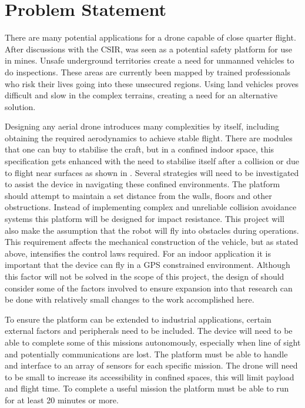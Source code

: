 	\section{Problem Statement}
	There are many potential applications for a drone capable of close quarter flight. After discussions with the CSIR, \projectName was seen as a potential safety platform for use in mines. Unsafe underground territories create a need for unmanned vehicles to do inspections. These areas are currently been mapped by trained professionals who risk their lives going into these unsecured regions. Using land vehicles proves difficult and slow in the complex terrains, creating a need for an alternative solution.
	
	Designing any aerial drone introduces many complexities by itself, including obtaining the required aerodynamics to achieve stable flight. There are modules that one can buy to stabilise the craft, but in a confined indoor space, this specification gets enhanced with the need to stabilise itself after a collision or due to flight near surfaces as shown in \cite{}. 
	Several strategies will need to be investigated to assist the device in navigating these confined environments. The platform should attempt to maintain a set distance from the walls, floors and other obstructions.
	Instead of implementing complex and unreliable collision avoidance systems this platform will be designed for impact resistance. This project will also make the assumption that the robot will fly into obstacles during operations. This requirement affects the mechanical construction of the vehicle, but as stated above, intensifies the control laws required.
	For an indoor application it is important that the device can fly in a GPS constrained environment. Although this factor will not be solved in the scope of this project, the design of \projectName should consider some of the factors involved to ensure expansion into that research can be done with relatively small changes to the work accomplished here.
	
	To ensure the platform can be extended to industrial applications, certain external factors and peripherals need to be included. The device will need to be able to complete some of this missions autonomously, especially when line of sight and potentially communications are lost.
	The platform must be able to handle and interface to an array of sensors for each specific mission. The drone will need to be small to increase its accessibility in confined spaces, this will limit payload and flight time. To complete a useful mission the platform must be able to run for at least 20 minutes  or more.

